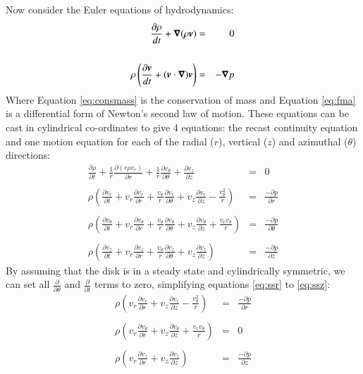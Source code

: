 \par Now consider the Euler equations of hydrodynamics:
\begin{eqnarray}
\frac{\partial\rho}{dt}+\bm{\nabla}(\rho\bm{v})&=&0\label{eq:consmass}\\\nonumber \\
\rho\left(\frac{\partial\bm{v}}{dt}+(\bm{v}\cdot\bm{\nabla}) \bm{v}\right)&=&-\bm{\nabla} p\label{eq:fma}
\end{eqnarray}
Where Equation \ref{eq:consmass} is the conservation of mass and Equation \ref{eq:fma} is a differential form of Newton's second law of motion.  These equations can be cast in cylindrical co-ordinates to give 4 equations: the recast continuity equation and one motion equation for each of the radial ($r$), vertical ($z$) and azimuthal ($\theta$) directions:
\begin{eqnarray}
\frac{\partial\rho}{\partial t}+\frac{1}{r}\frac{\partial(r\rho v_r)}{\partial r}+\frac{1}{r}\frac{\partial v_\theta}{\partial\theta}+\frac{\partial v_z}{\partial z}&=&0\label{eq:ssc}\\\nonumber\\
\rho\left(\frac{\partial v_r}{\partial t}+v_r\frac{\partial v_r}{\partial r}+\frac{v_\theta}{r}\frac{\partial v_r}{\partial\theta}+v_z\frac{\partial v_r}{\partial z}-\frac{v_\theta^2}{r}\right)&=&\frac{-\partial p}{\partial r}\label{eq:ssr}\\\nonumber\\
\rho\left(\frac{\partial v_\theta}{\partial t}+v_r\frac{\partial v_\theta}{\partial r}+\frac{v_\theta}{r}\frac{\partial v_\theta}{\partial\theta}+v_z\frac{\partial v_\theta}{\partial z}+\frac{v_rv_\theta}{r}\right)&=&\frac{-\partial p}{\partial\theta}\\\nonumber\\
\rho\left(\frac{\partial v_z}{\partial t}+v_r\frac{\partial v_z}{\partial r}+\frac{v_\theta}{r}\frac{\partial v_z}{\partial\theta}+v_z\frac{\partial v_z}{\partial z}\right)&=&\frac{-\partial p}{\partial z}\label{eq:ssz}
\end{eqnarray}
By assuming that the disk is in a steady state and cylindrically symmetric, we can set all $\frac{\partial}{\partial\theta}$ and $\frac{\partial}{\partial t}$ terms to zero, simplifying equations \ref{eq:ssr} to \ref{eq:ssz}:
\begin{eqnarray}
\rho\left(v_r\frac{\partial v_r}{\partial r}+v_z\frac{\partial v_r}{\partial z}-\frac{v_\theta^2}{r}\right)&=&\frac{-\partial p}{\partial r}\label{eq:ssrs}\\\nonumber\\
\rho\left(v_r\frac{\partial v_\theta}{\partial r}+v_z\frac{\partial v_\theta}{\partial z}+\frac{v_rv_\theta}{r}\right)&=&0\label{eq:ssts}\\\nonumber\\
\rho\left(v_r\frac{\partial v_z}{\partial r}+v_z\frac{\partial v_z}{\partial z}\right)&=&\frac{-\partial p}{\partial z}\label{eq:sszs}
\end{eqnarray}
